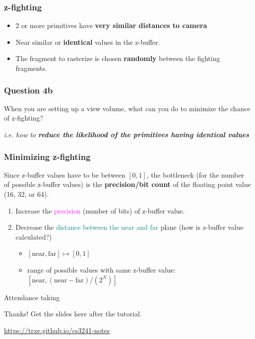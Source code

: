 \documentclass{beamer}
\begin{document}
\begin{frame}
    \frametitle{z-fighting}

    \begin{itemize}
        \item 2 or more primitives have \textbf{very similar distances to camera}
        \item Near similar or \textbf{identical} values in the z-buffer.
        \item The fragment to rasterize is chosen \textbf{randomly} between the fighting fragments.
    \end{itemize}

\end{frame}

\begin{frame}
    \frametitle{Question 4b}

    When you are setting up a view volume, what can you do to minimize the chance of z-fighting? 

    \vspace{1em}
    \textit{i.e. how to \textbf{reduce the likelihood of the primitives having identical values}}

\end{frame}

\begin{frame}
    \frametitle{Minimizing z-fighting}

    Since z-buffer values have to be between $[0, 1]$, the bottleneck (for the number of possible z-buffer values)
    is the \textbf{precision/bit count} of the floating point value (16, 32, or 64).

    \begin{enumerate}
        \item Increase the \textcolor{magenta}{precision} (number of bits) of z-buffer value.
        \item Decrease the \textcolor{teal}{distance between the near and far} plane (how is z-buffer value calculated?)
        \begin{itemize}
            \item $[\text{near}, \text{far}] \mapsto [0, 1]$
            \item range of possible values with same z-buffer value: 
                $[\text{near}, (\text{near} - \text{far})/(2^N)]$
        \end{itemize}
    \end{enumerate}

\end{frame}

\begin{frame}
    \AlegreyaExtraBold \LARGE
    Attendance taking
\end{frame}

\ThankYou
\begin{frame}
    Thanks! Get the slides here after the tutorial.\\
    \vspace{2em}
    \scalebox{3}{\faGithub}\par\bigskip
    \url{https://trxe.github.io/cs3241-notes}
\end{frame}
\end{document}
